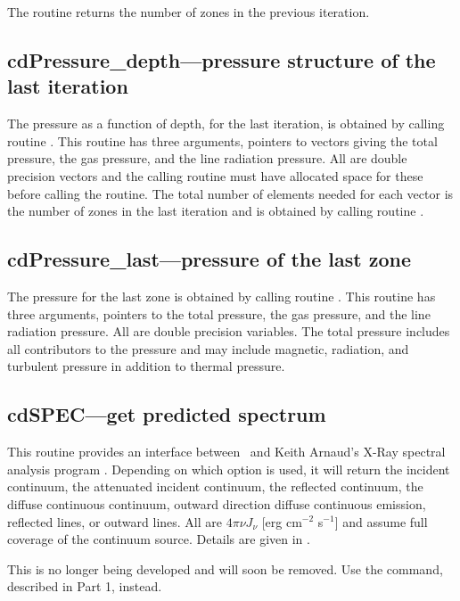 The routine returns the number of zones in the previous iteration.

\subsection{cdPressure\_depth---pressure structure of the last iteration }

The pressure as a function of depth, for the last iteration, is obtained
by calling routine .  This routine has three arguments,
pointers to vectors giving the total pressure, the gas pressure, and the
line radiation pressure.  All are double precision vectors and the calling
routine must have allocated space for these before calling the routine.
The total number of elements needed for each vector is the number of zones
in the last iteration and is obtained by calling routine .

\subsection{cdPressure\_last---pressure of the last zone }

The pressure for the last zone is obtained by calling routine
.
This routine has three arguments, pointers to the total
pressure, the gas pressure, and the line radiation pressure.
All are double
precision variables.
The total pressure includes all contributors to the
pressure and may include magnetic, radiation, and turbulent pressure in
addition to thermal pressure.

\subsection{cdSPEC---get predicted spectrum}

This routine provides an interface between \Cloudy\ and Keith Arnaud's
X-Ray spectral analysis program .
Depending on which option is used,
it will return the incident continuum, the attenuated incident continuum,
the reflected continuum, the diffuse continuous continuum, outward direction
diffuse continuous emission, reflected lines, or outward lines.
All are
$4\pi \nu J_\nu$ [erg cm$^{-2}$ s$^{-1}$] and assume full coverage of the continuum source.
Details are given in .

This is no longer being developed and will soon be removed.
Use the
 command, described in Part 1, instead.

